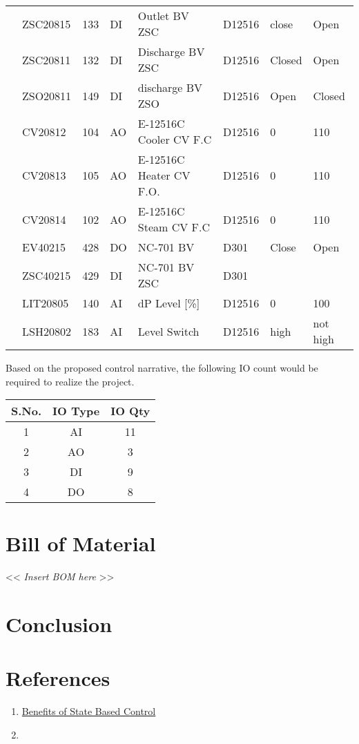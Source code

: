 \documentclass[a4paper,oneside]{article}
\begin{document}
\begin{center}
\begin{tabular}{llrlllll}
 & ZSC20815 & 133 & DI & Outlet BV ZSC & D12516 & close & Open\\
 & ZSC20811 & 132 & DI & Discharge BV ZSC & D12516 & Closed & Open\\
 & ZSO20811 & 149 & DI & discharge BV ZSO & D12516 & Open & Closed\\
 & CV20812 & 104 & AO & E-12516C Cooler CV F.C & D12516 & 0 & 110\\
 & CV20813 & 105 & AO & E-12516C Heater CV F.O. & D12516 & 0 & 110\\
 & CV20814 & 102 & AO & E-12516C Steam CV F.C & D12516 & 0 & 110\\
 & EV40215 & 428 & DO & NC-701 BV & D301 & Close & Open\\
 & ZSC40215 & 429 & DI & NC-701 BV ZSC & D301 &  & \\
 & LIT20805 & 140 & AI & dP Level [\%] & D12516 & 0 & 100\\
 & LSH20802 & 183 & AI & Level Switch & D12516 & high & not high\\
\end{tabular}
\end{center}

Based on the proposed control narrative, the following IO count would be required to realize the project. 
\begin{center}
\begin{tabular}{ccc}
S.No. & IO Type & IO Qty\\
\hline
1 & AI & 11\\
2 & AO & 3\\
3 & DI & 9\\
4 & DO & 8\\
\end{tabular}
\end{center}


\section{Bill of Material}
\label{sec:org30eebde}
<< \emph{Insert BOM here} >>
\section{Conclusion}
\label{sec:org3f013c3}
\section{References}
\label{sec:orgb7395db}
\begin{enumerate}
\item \href{https://www.controlglobal.com/assets/knowledge\_centers/abb/assets/Benefits-of-state-based-control-white-paper.pdf}{Benefits of State Based Control}
\item 
\end{enumerate}
\end{document}
